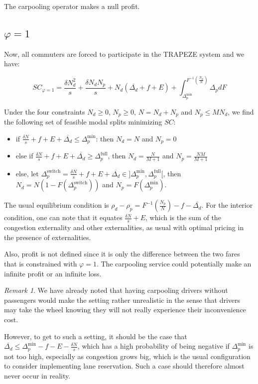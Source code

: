 \documentclass[english, a4paper]{article}
\theoremstyle{plain}
\theoremstyle{definition}
\theoremstyle{remark}
\newtheorem{remark}{Remark}
\begin{document}
The carpooling operator makes a null profit.

\subsection{\texorpdfstring{$\varphi = 1$}{varphi = 1}}

Now, all commuters are forced to participate in the TRAPEZE system and we have:

\begin{equation}
    SC_{\varphi = 1} = \frac{\delta N_d^2}{s} + \frac{\delta N_d N_p}{s} + N_d (\overline{\Delta_d} + f + E) + \int_{\Delta_p^{\text{min}}}^{F^{-1}\left( \frac{N_p}{N} \right)} \Delta_pdF
\end{equation}

Under the four constraints $N_d \geq 0$, $N_p \geq 0$, $N = N_d + N_p$ and $N_p \leq MN_d$, we find the following set of feasible modal splits minimizing $SC$:
\begin{itemize}
    \item if $\frac{\delta N}{s} + f + E + \overline{\Delta_d} \leq \Delta_p^{\text{min}}$: then $N_d = N$ and $N_p = 0$
    \item else if $\frac{\delta N}{s} + f + E + \overline{\Delta_d} \geq \Delta_p^{\text{full}}$, then $N_d = \frac{N}{M + 1}$ and $N_p = \frac{NM}{M + 1}$
    \item else, let $\Delta_p^{\text{switch}} = \frac{\delta N}{s} + f + E + \overline{\Delta_d} \in ]\Delta_p^{\text{min}}, \Delta_p^{\text{full}}[$, then $N_d = N(1 - F(\Delta_p^{\text{switch}}))$ and $N_p = F(\Delta_p^{\text{min}})$.
\end{itemize}

The usual equilibrium condition is $\rho_d - \rho_p = F^{-1}\left(\frac{N_p}{N} \right) - f - \overline{\Delta_d}$. For the interior condition, one can note that it equates $\frac{\delta N}{s} + E$, which is the sum of the congestion externality and other externalities, as usual with optimal pricing in the presence of externalities.

Also, profit is not defined since it is only the difference between the two fares that is constrained with $\varphi = 1$. The carpooling service could potentially make an infinite profit or an infinite loss.

\begin{remark}
    We have already noted that having carpooling drivers without passengers would make the setting rather unrealistic in the sense that drivers may take the wheel knowing they will not really experience their inconvenience cost.

    However, to get to such a setting, it should be the case that $\overline{\Delta_d} \leq \Delta_p^{\text{min}} - f - E - \frac{\delta N}{s}$, which has a high probability of being negative if $\Delta_p^{\text{min}}$ is not too high, especially as congestion grows big, which is the usual configuration to consider implementing lane reservation. Such a case should therefore almost never occur in reality.
\end{remark}
\end{document}
